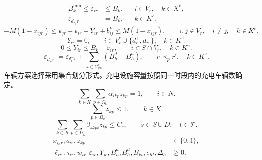\documentclass{setp-new}
\begin{document}
\begin{equation}
\begin{aligned}
B_k^{\min}\le\varepsilon_{ir}&\le B_k,
&&i\in V_r,\quad k\in K^{e},\\
\varepsilon_{d_{r_1}^{+}r_1}&=B_k,
&&k\in K^{e}.
\end{aligned}
\label{eq:unified-battery-bound}
\end{equation}
\begin{equation}
-M(1-x_{ijr})
\le\varepsilon_{jr}-\varepsilon_{ir}-Y_{ir}+b_{ij}^{k}
\le M(1-x_{ijr}),
\qquad i,j\in V_r,\quad i\ne j,\quad k\in K^{e}.
\label{eq:unified-battery-propagation}
\end{equation}
\begin{equation}
Y_{ir}=0,
\qquad i\in V_r^{c}\cup\{d_r^{+},d_r^{-}\},\quad k\in K^{e}.
\label{eq:unified-no-customer-charge}
\end{equation}
\begin{equation}
0\le Y_{ir}\le B_k-\varepsilon_{ir},
\qquad i\in S\cap V_r,\quad k\in K^{e}.
\label{eq:unified-charge-bound}
\end{equation}
\begin{equation}
\varepsilon_{d_{r'}^{+}r'}
=\varepsilon_{d_r^{-}r}
+\sum_{h\in\mathcal C_{kp}^{rr'}}(B_h^{d}-B_h^{a}),
\qquad r\prec_p r',\quad k\in K^{e}.
\label{eq:unified-trip-link-energy}
\end{equation}
车辆方案选择采用集合划分形式\cite{ref:sahin}。充电设施容量按照同一时段内的充电车辆数确定\cite{ref:12}。
\begin{equation}
\sum_{k\in K}\sum_{p\in\Omega_k}\alpha_{ikp}z_{kp}=1,
\qquad i\in N .
\label{eq:unified-coverage}
\end{equation}
\begin{equation}
\sum_{p\in\Omega_k}z_{kp}\le1,
\qquad k\in K .
\label{eq:unified-vehicle}
\end{equation}
\begin{equation}
\sum_{k\in K}\sum_{p\in\Omega_k}\beta_{skpt}z_{kp}\le C_s,
\qquad s\in S\cup D,\quad t\in\mathcal T .
\label{eq:unified-station}
\end{equation}
\begin{equation}
\begin{aligned}
x_{ijr},a_{ir},z_{kp}&\in\{0,1\},\\
\ell_{ir},\tau_{ir},w_{ir},\varepsilon_{ir},Y_{ir},
B_h^{a},B_h^{d},B_{ht},e_{ht},\Delta_h&\ge0 .
\end{aligned}
\label{eq:unified-domain}
\end{equation}
\end{document}
